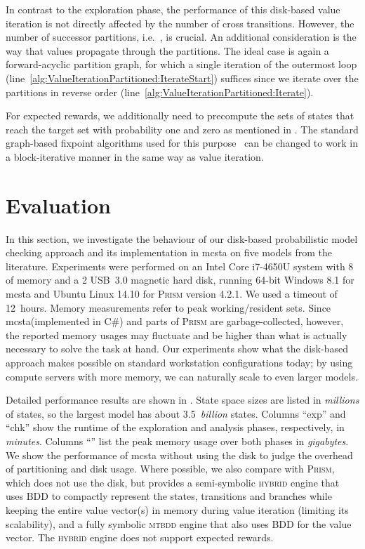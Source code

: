 \documentclass{llncs}
\newcommand{\mcsta}{\textsf{\mbox{mcsta}}\xspace}
\newcommand{\ie}{i.e.\ }
\newcommand{\sunit}[1]{\text{\begin{scriptsize}\,#1\end{scriptsize}}}
\newcommand{\ssunit}[1]{\text{\begin{scriptsize}#1\end{scriptsize}}}
\newcommand{\prism}{\textsc{Prism}\xspace}
\begin{document}
In contrast to the exploration phase, the performance of this disk-based value iteration is not directly affected by the number of cross transitions.
However, the number of successor partitions, \ie , is crucial.
An additional consideration is the way that values propagate through the partitions.
The ideal case is again a forward-acyclic partition graph, for which
a single iteration of the outermost loop (line~\ref{alg:ValueIterationPartitioned:IterateStart}) suffices since we iterate over the partitions in reverse order (line~\ref{alg:ValueIterationPartitioned:Iterate}).

For expected rewards, we additionally need to precompute the sets of states that reach the target set with probability one and zero as mentioned in .
The standard graph-based fixpoint algorithms used for this purpose~\cite{FKNP11} can be changed to work in a block-iterative manner in the same way as value iteration.




\section{Evaluation}
\label{sec:Evaluation}

In this section, we investigate the behaviour of our disk-based probabilistic model checking approach and its implementation in \mcsta on five models from the literature. Experiments were performed on an Intel Core i7-4650U system with 8\sunit{GB} of memory and a 2\sunit{TB} USB~3.0 magnetic hard disk, running
64-bit Windows 8.1 for \mcsta and Ubuntu Linux 14.10 for \prism version 4.2.1.
We used a timeout of 12~hours.
Memory measurements refer to peak working/resident sets.
Since \mcsta (implemented in C\#) and parts of \prism are garbage-collected, however, the reported memory usages may fluctuate and be higher than what is actually necessary to solve the task at hand.
Our experiments show what the disk-based approach makes possible on standard workstation configurations today; by using compute servers with more memory, we can naturally scale to even larger models.

Detailed performance results are shown in .
State space sizes are listed in \emph{millions} of states, so the largest model has about 3.5~\emph{billion} states.
Columns ``exp'' and ``chk'' show the runtime of the exploration and analysis phases, respectively, in \emph{minutes}.
Columns ``\ssunit{\!GB}'' list the peak memory usage over both phases in \emph{gigabytes}.
We show the performance of \mcsta without using the disk to judge the overhead of partitioning and disk usage. 
Where possible, we also compare with \prism, which does not use the disk, but provides a semi-symbolic \textsc{hybrid} engine that uses BDD to compactly represent the states, transitions and branches while keeping the entire value vector(s) in memory during value iteration (limiting its scalability), and a fully symbolic \textsc{mtbdd} engine that also uses BDD for the value vector.
The \textsc{hybrid} engine does not support expected rewards.
\end{document}
